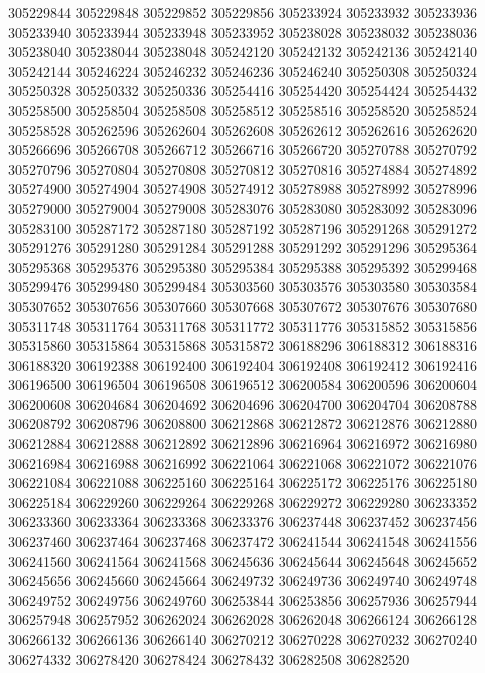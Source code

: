 { 305229844
 305229848
 305229852
 305229856
 305233924
 305233932
 305233936
 305233940
 305233944
 305233948
 305233952
 305238028
 305238032
 305238036
 305238040
 305238044
 305238048
 305242120
 305242132
 305242136
 305242140
 305242144
 305246224
 305246232
 305246236
 305246240
 305250308
 305250324
 305250328
 305250332
 305250336
 305254416
 305254420
 305254424
 305254432
 305258500
 305258504
 305258508
 305258512
 305258516
 305258520
 305258524
 305258528
 305262596
 305262604
 305262608
 305262612
 305262616
 305262620
 305266696
 305266708
 305266712
 305266716
 305266720
 305270788
 305270792
 305270796
 305270804
 305270808
 305270812
 305270816
 305274884
 305274892
 305274900
 305274904
 305274908
 305274912
 305278988
 305278992
 305278996
 305279000
 305279004
 305279008
 305283076
 305283080
 305283092
 305283096
 305283100
 305287172
 305287180
 305287192
 305287196
 305291268
 305291272
 305291276
 305291280
 305291284
 305291288
 305291292
 305291296
 305295364
 305295368
 305295376
 305295380
 305295384
 305295388
 305295392
 305299468
 305299476
 305299480
 305299484
 305303560
 305303576
 305303580
 305303584
 305307652
 305307656
 305307660
 305307668
 305307672
 305307676
 305307680
 305311748
 305311764
 305311768
 305311772
 305311776
 305315852
 305315856
 305315860
 305315864
 305315868
 305315872
 306188296
 306188312
 306188316
 306188320
 306192388
 306192400
 306192404
 306192408
 306192412
 306192416
 306196500
 306196504
 306196508
 306196512
 306200584
 306200596
 306200604
 306200608
 306204684
 306204692
 306204696
 306204700
 306204704
 306208788
 306208792
 306208796
 306208800
 306212868
 306212872
 306212876
 306212880
 306212884
 306212888
 306212892
 306212896
 306216964
 306216972
 306216980
 306216984
 306216988
 306216992
 306221064
 306221068
 306221072
 306221076
 306221084
 306221088
 306225160
 306225164
 306225172
 306225176
 306225180
 306225184
 306229260
 306229264
 306229268
 306229272
 306229280
 306233352
 306233360
 306233364
 306233368
 306233376
 306237448
 306237452
 306237456
 306237460
 306237464
 306237468
 306237472
 306241544
 306241548
 306241556
 306241560
 306241564
 306241568
 306245636
 306245644
 306245648
 306245652
 306245656
 306245660
 306245664
 306249732
 306249736
 306249740
 306249748
 306249752
 306249756
 306249760
 306253844
 306253856
 306257936
 306257944
 306257948
 306257952
 306262024
 306262028
 306262048
 306266124
 306266128
 306266132
 306266136
 306266140
 306270212
 306270228
 306270232
 306270240
 306274332
 306278420
 306278424
 306278432
 306282508
 306282520
}
